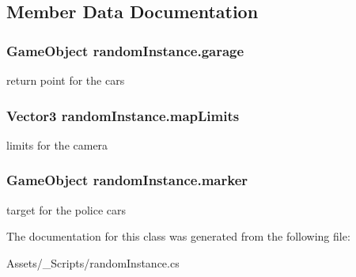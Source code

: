 \subsection{Member Data Documentation}
\hypertarget{classrandom_instance_aa1cf4fffeff6817cf74a11edb50dab5f}{}
\subsubsection[{garage}]{\setlength{\rightskip}{0pt plus 5cm}Game\+Object random\+Instance.\+garage}\label{classrandom_instance_aa1cf4fffeff6817cf74a11edb50dab5f}
return point for the cars \hypertarget{classrandom_instance_a33ee46bc94d972337d4b332f1473ed1b}{}
\subsubsection[{map\+Limits}]{\setlength{\rightskip}{0pt plus 5cm}Vector3 random\+Instance.\+map\+Limits}\label{classrandom_instance_a33ee46bc94d972337d4b332f1473ed1b}
limits for the camera \hypertarget{classrandom_instance_ad4bc8c2a580c04743c7ffb1aef90eaa6}{}
\subsubsection[{marker}]{\setlength{\rightskip}{0pt plus 5cm}Game\+Object random\+Instance.\+marker}\label{classrandom_instance_ad4bc8c2a580c04743c7ffb1aef90eaa6}
target for the police cars 

The documentation for this class was generated from the following file\+:\begin{DoxyCompactItemize}
\item 
Assets/\+\_\+\+Scripts/random\+Instance.\+cs\end{DoxyCompactItemize}
